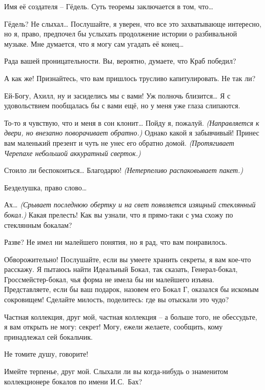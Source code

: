 \documentclass[../main.tex]{subfiles}
\begin{document}
\begin{Dialogue}
 {\Large И}мя её создателя \--- Гёдель. Суть теоремы заключается в том, что\ldots{}

 Гёдель? Не слыхал\ldots{} Послушайте, я уверен, что все это захватывающе интересно, но я, право, предпочел бы услыхать продолжение истории о разбивальной музыке. Мне думается, что я могу сам угадать её конец\ldots{}

 Рада вашей проницательности. Вы, вероятно, думаете, что Краб победил?

 А как же! Признайтесь, что вам пришлось трусливо капитулировать. Не так ли?

 Ей-Богу, Ахилл, ну и засиделись мы с вами! Уж полночь близится\ldots{} Я с удовольствием пообщалась бы с вами ещё, но у меня уже глаза слипаются.

 То-то я чувствую, что и меня в сон клонит\ldots{} Пойду я, пожалуй. \emph{(Направляется к двери, но внезапно поворачивает обратно.)} Однако какой я забывчивый! Принес вам маленький презент и чуть не унес его обратно домой. \emph{(Протягивает Черепахе небольшой аккуратный сверток.)}

 {\Large С}тоило ли беспокоиться\ldots{} Благодарю! \emph{(Нетерпеливо распаковывает пакет.)}

 {\Large Б}езделушка, право слово\ldots{}

 Ах\ldots{} \emph{(Срывает последнюю обертку и на свет появляется изящный стеклянный бокал.)} Какая прелесть! Как вы узнали, что я прямо-таки с ума схожу по стеклянным бокалам?

 Разве? Не имел ни малейшего понятия, но я рад, что вам понравилось.

 Обворожительно! Послушайте, если вы умеете хранить секреты, я вам кое-что расскажу. Я пытаюсь найти Идеальный Бокал, так сказать, Генерал-бокал, Гроссмейстер-бокал, чья форма не имела бы ни малейшего изъяна. Представляете, если бы ваш подарок, назовем его Бокал Г, оказался бы искомым сокровищем! Сделайте милость, поделитесь: где вы отыскали это чудо?

 Частная коллекция, друг мой, частная коллекция \--- а больше того, не обессудьте, я вам открыть не могу: секрет! Могу, ежели желаете, сообщить, кому принадлежал сей бокальчик.

 Не томите душу, говорите!

 Имейте терпенье, друг мой. Слыхали ли вы когда-нибудь о знаменитом коллекционере бокалов по имени И.С.~Бах?


\end{Dialogue}
\end{document}
